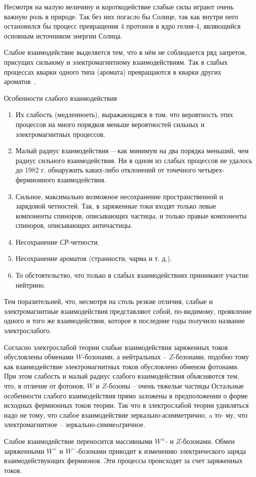 Несмотря на малую величину и короткодействие слабые силы играют очень важную роль в природе. Так без них погасло бы Солнце, так как внутри него остановился бы процесс превращения 4 протонов в ядро гелия-4, являющийся основным источником энергии Солнца.

Слабое взаимодействие выделяется тем, что в нём не соблюдается ряд запретов, присущих сильному и электромагнитному взаимодействиям. Так в слабых процессах кварки одного типа (аромата) превращаются в кварки других ароматов~\cite{nuclphys:weak}.

Особенности слабого взаимодействия

\begin{enumerate}
	\item Их слабость (медленноеть), выражающаяся в том, что
	вероятность этих процессов на много порядков меньше
	вероятностей сильных и электромагнитных процессов.
	
	\item Малый радиус взаимодействия —как минимум на
	два порядка меньший, чем радиус сильного взаимодействия.
	Ни в одном из слабых процессов не удалось до 1982 г. обнаружить каких-либо отклонений от точечного четырех-
	фермионного взаимодействия.
	
	\item Сильное, максимально возможное несохранение пространственной и зарядовой четностей. Так, в заряженные
	токи входят только левые компоненты спиноров, описывающих частицы, и только правые компоненты спиноров,
	описывающих античастицы.
	
	\item Несохранение \textit{СР}-четности.
	
	\item Несохранение ароматов (странности, чарма и т. д.).
	
	\item  То обстоятельство, что только в слабых взаимодействиях принимают участие нейтрино.
	
\end{enumerate}

Тем поразительней, что, несмотря на столь резкие отличия, слабые и электромагнитные взаимодействия представляют собой, по-видимому, проявление одного и того же
взаимодействия, которое в последние годы получило название электрослабого.

Согласно электрослабой теории слабые взаимодействия
заряженных токов обусловлены обменами $W$-бозонами, а
нейтральных -- $Z$-бозонами, подобно тому как взаимодействие электромагнитных токов обусловлено обменом фотонами. При этом слабость и малый радиус слабого взаимодействия объясняются тем, что, в отличие от фотонов, $W$ и $Z$-бозоны -- очень тяжелые частицы Остальные особенности слабого взаимодействия прямо заложены в предположении о форме исходных фермионных токов теории.
Так что в злектрослабой теории удивляться надо не тому,
что слабое взаимодействие зеркально-асимметрично, a то-
му, что электромагнитное -- зеркально-симмеnгричное.

Слабое взаимодействие переносится массивными $W^±$- и $Z$-бозонами. Обмен заряженными $W^+$ и $W^-$-бозонами приводит к изменению электрического заряда взаимодействующих фермионов. Эти процессы происходят за счет заряженных токов.



